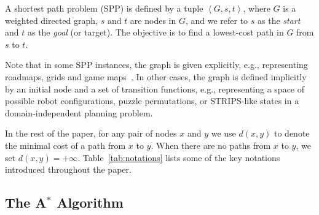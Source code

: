 \documentclass[smallextended]{svjour3}       %
\newcommand{\spp}{\ac{SPP}\xspace}
\newcommand{\astar}{A$^*$\xspace}
\newcommand{\tuple}[1]{\ensuremath{\left \langle #1 \right \rangle }}
\newcommand{\roni}[1]{\textbf{[RS:#1]}}
\begin{document}

\begin{definition}
  \label{def:spp}
  A shortest path problem (\spp) is defined by a tuple $\tuple{G, s, t}$, where $G$ is a weighted directed graph, $s$ and $t$ are nodes in $G$, and we refer to $s$ as the \emph{start} and $t$ as the \emph{goal} (or target). 
  The objective is to find a lowest-cost path in $G$ from $s$ to $t$. %
\end{definition}

Note that in some \ac{SPP} instances, the graph is given explicitly, e.g., representing roadmaps, grids and game maps~\cite{sturtevant2012benchmarks}. 
In other cases, the graph is defined implicitly by an initial node and a set of transition functions, e.g., representing a space of possible robot configurations, puzzle permutations, or STRIPS-like states in a domain-independent planning problem.



In the rest of the paper, for any pair of nodes $x$ and $y$ we use $d(x, y)$ to denote the minimal cost of a path from $x$ to $y$.
When there are no paths from $x$ to $y$, we set $d(x, y) = +\infty$.
Table~\ref{tab:notations} lists some of the key notations introduced throughout the paper.

\subsection{The \astar Algorithm}
\end{document}
